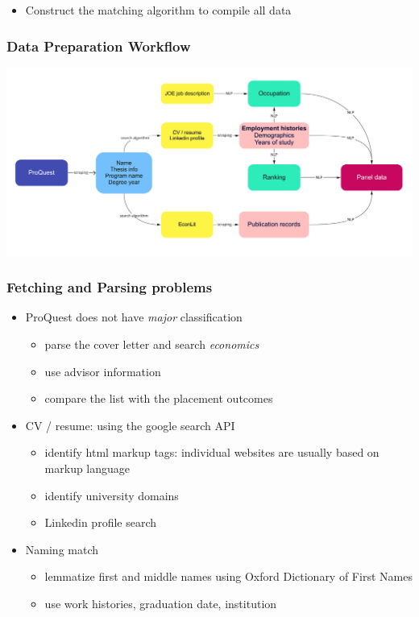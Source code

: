 \documentclass[10pt,svgnames,fragile]{beamer}
\begin{document}
{\begin{frame}[label=Data]
\begin{itemize}
\vfill
			\item Construct the matching algorithm to compile all data %
\vfill
		\end{itemize}
	\end{frame}

\begin{frame}
	\frametitle{Data Preparation Workflow}
	\includegraphics[width=\linewidth]{pic_flow.jpg}
\end{frame}


\begin{frame}
	\frametitle{Fetching and Parsing problems}
	\begin{itemize}
		\item ProQuest does not have \textit{major} classification
		\begin{itemize}
			\item parse the cover letter and search \textit{economics}  
			\item use advisor information
			\item compare the list with the placement outcomes
		\end{itemize}
	\vfill
		\item CV / resume: using the google search API
		\begin{itemize}
			\item identify html markup tags: individual websites are usually based on markup language 
			\item identify university domains
			\item Linkedin profile search 
		\end{itemize}
		\vfill
			\item Naming match
			\begin{itemize}
				\item lemmatize first and middle names using  Oxford Dictionary of First Names 
				\item use work histories, graduation date, institution
			\end{itemize}
				\vfill
		

\end{itemize}
\end{frame}}
\end{document}
